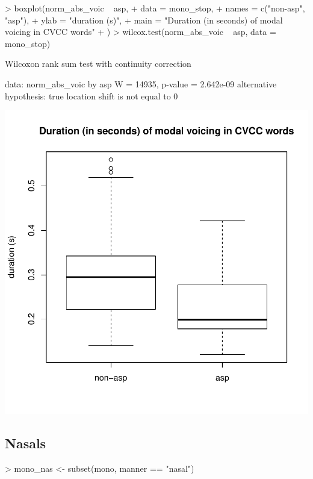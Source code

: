 \documentclass[a4paper,11pt]{article}
\begin{document}
\begin{Schunk}
\begin{Sinput}
> boxplot(norm_abs_voic ~ asp,
+         data = mono_stop,
+         names = c("non-asp", "asp"),
+         ylab = "duration (s)",
+         main = "Duration (in seconds) of modal voicing in CVCC words"
+         )
> wilcox.test(norm_abs_voic ~ asp, data = mono_stop)
\end{Sinput}
\begin{Soutput}
	Wilcoxon rank sum test with continuity correction

data:  norm_abs_voic by asp
W = 14935, p-value = 2.642e-09
alternative hypothesis: true location shift is not equal to 0
\end{Soutput}
\end{Schunk}
\includegraphics{analysis-009}

\subsection{Nasals}

\begin{Schunk}
\begin{Sinput}
> mono_nas <- subset(mono, manner == "nasal")
\end{Sinput}
\end{Schunk}
\end{document}
